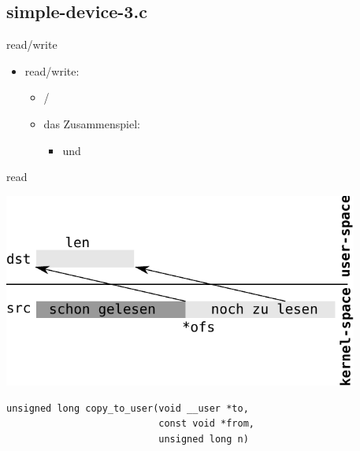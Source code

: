 \subsection{simple-device-3.c}
\begin{frame}{}{read/write}
\begin{itemize}
 \item read/write:
 \begin{itemize}
  \item {}/
  \item das Zusammenspiel:
  \begin{itemize}
   \item {} und 
  \end{itemize}
 \end{itemize}
\end{itemize}
\end{frame}

\begin{frame}[fragile]{read}
\begin{center}
 \includegraphics[width=0.875\textwidth]{user-kernel-space-read.pdf}
\end{center}
\vspace{-1.5cm}
\begin{lstlisting}
unsigned long copy_to_user(void __user *to, 
                           const void *from, 
                           unsigned long n)
\end{lstlisting}
\end{frame}

